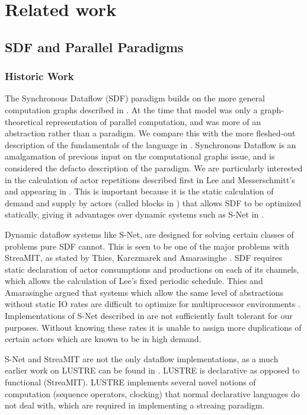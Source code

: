 \chapter{Related work}
\label{chapRelated}

\section{SDF and Parallel Paradigms}

\subsection{Historic Work}

The Synchronous Dataflow (SDF) paradigm builds on the more general computation graphs described in \cite{kar66}.
At the time that model was only a graph-theoretical representation of parallel computation, and was more of an abstraction rather than a paradigm.
We compare this with the more fleshed-out description of the fundamentals of the language in \cite{sdfBook}.
Synchronous Dataflow is an amalgamation of previous input on the computational graphs issue, and is considered the defacto description of the paradigm.
We are particularly interested in the calculation of actor repetitions described first in Lee and Messerschmitt's \cite{lee87} and appearing in \cite{sdfBook}.
This is important because it is the static calculation of demand and supply by actors (called blocks in \cite{lee87}) that allows SDF to be optimized statically, giving it advantages over dynamic systems such as S-Net in \cite{pen09}.

Dynamic dataflow systems like S-Net, are designed for solving certain classes of problems pure SDF cannot.
This is seen to be one of the major problems with StreaMIT, as stated by Thies, Karczmarek and Amarasinghe \cite{thies02}.
SDF requires static declaration of actor consumptions and productions on each of its channels, which allows the calculation of Lee's fixed periodic schedule.
Thies and Amarasinghe argued that systems which allow the same level of abstractions without static IO rates are difficult to optimize for multiprocessor environments \cite{thies10}.
Implementations of S-Net described in \cite{pen09} are not sufficiently fault tolerant for our purposes.
Without knowing these rates it is unable to assign more duplications of certain actors which are known to be in high demand.

S-Net and StreaMIT are not the only dataflow implementations, as a much earlier work on LUSTRE can be found in \cite{cas87}.
LUSTRE is declarative as opposed to functional (StreaMIT).
LUSTRE implements several novel notions of computation (sequence operators, clocking) that normal declarative languages do not deal with, which are required in implementing a streaing paradigm.

